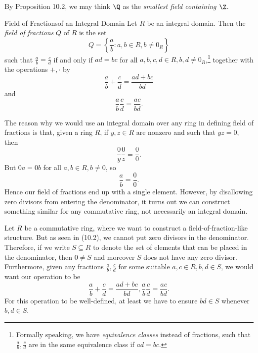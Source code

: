 \documentclass[pmath347]{subfiles}
\begin{document}
    \noindent By Proposition 10.2, we may think $\Q$ as the \textit{smallest field containing $\Z$}.

    \begin{definition}{Field of Fractions}{of an Integral Domain}
        Let $R$ be an integral domain. Then the \emph{field of fractions} $Q$ of $R$ is the set
        \begin{equation*}
            Q = \left\lbrace \frac{a}{b}:a,b\in R, b\neq 0_R \right\rbrace 
        \end{equation*}
        such that $\frac{a}{b}=\frac{c}{d}$ if and only if $ad=bc$ for all $a,b,c,d\in R, b,d\neq 0_R$,\footnote{Formally speaking, we have \textit{equivalence classes} instead of fractions, such that $\frac{a}{b},\frac{c}{d}$ are in the same equivalence class if $ad=bc$.} together with the operations $+,\cdot$ by
        \begin{equation*}
            \frac{a}{b}+\frac{c}{d} = \frac{ad+bc}{bd}
        \end{equation*}
        and
        \begin{equation*}
            \frac{a}{b}\frac{c}{d}=\frac{ac}{bd}.
        \end{equation*}
    \end{definition}

    \np The reason why we would use an integral domain over any ring in defining field of fractions is that, given a ring $R$, if $y,z\in R$ are nonzero and such that $yz=0$, then
    \begin{equation*}
        \frac{0}{y}\frac{0}{z}= \frac{0}{0}.
    \end{equation*}
    But $0a=0b$ for all $a,b\in R, b\neq 0$, so
    \begin{equation*}
        \frac{a}{b} = \frac{0}{0}.
    \end{equation*}
    Hence our field of fractions end up with a single element. However, by disallowing zero divisors from entering the denominator, it turns out we can construct something similar for any commutative ring, not necessarily an integral domain.

    \np[Localization]Let $R$ be a commutative ring, where we want to construct a field-of-fraction-like structure. But as seen in (10.2), we cannot put zero divisors in the denominator. Therefore, if we write $S\subseteq R$ to denote the set of elements that can be placed in the denominator, then $0\neq S$ and moreover $S$ does not have any zero divisor. Furthermore, given any fractions $\frac{a}{b},\frac{c}{d}$ for some suitable $a,c\in R, b,d\in S$, we would want our operation to be
    \begin{equation*}
        \frac{a}{b}+\frac{c}{d} = \frac{ad+bc}{bd}, \frac{a}{b}\frac{c}{d} = \frac{ac}{bd}.
    \end{equation*}
    For this operation to be well-defined, at least we have to ensure $bd\in S$ whenever $b,d\in S$.
\end{document}
